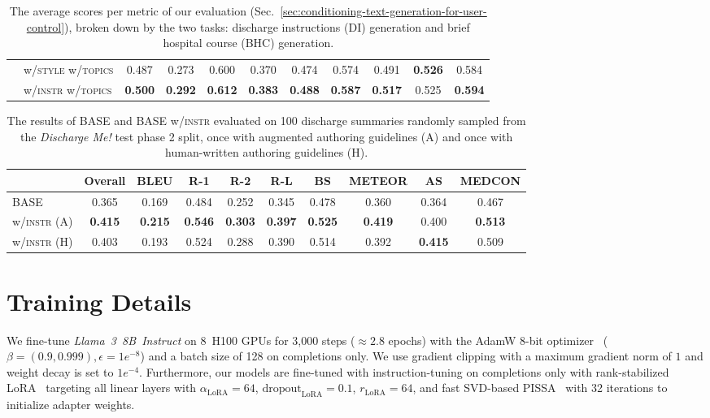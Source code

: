 \begin{table*}[t!]
{\begin{tabular}{llccccccccc}
 & \hspace{3mm} w/\textsc{style} w/\textsc{topics} & 0.487 & 0.273 & 0.600 & 0.370 & 0.474 & 0.574 & 0.491 & \textbf{0.526} & 0.584 \\
 & \hspace{3mm} w/\textsc{instr} w/\textsc{topics} & \textbf{0.500} & \textbf{0.292} & \textbf{0.612} & \textbf{0.383} & \textbf{0.488} & \textbf{0.587} & \textbf{0.517} & 0.525 & \textbf{0.594} \\
\hline
\end{tabular}
}
\caption{The average scores per metric of our evaluation (Sec.~\ref{sec:conditioning-text-generation-for-user-control}), broken down by the two tasks: discharge instructions (DI) generation and brief hospital course (BHC) generation.}
\label{table:task_performance}
\end{table*}

\begin{table*}[t!]
\centering
\begin{tabular}{lccccccccc}
\hline
 & Overall & BLEU & R-1 & R-2 & R-L & BS & METEOR & AS & MEDCON \\
\hline
BASE & 0.365 & 0.169 & 0.484 & 0.252 & 0.345 & 0.478 & 0.360 & 0.364 & 0.467 \\

\hspace{3mm} w/\textsc{instr} (A) & \textbf{0.415} & \textbf{0.215} & \textbf{0.546} & \textbf{0.303} & \textbf{0.397} & \textbf{0.525} & \textbf{0.419} & 0.400 & \textbf{0.513}  \\
\hspace{3mm} w/\textsc{instr} (H) & 0.403 & 0.193 & 0.524 & 0.288 & 0.390 & 0.514 & 0.392 & \textbf{0.415} & 0.509 \\
\hline
\end{tabular}
\caption{The results of BASE and BASE w/\textsc{instr} evaluated on 100 discharge summaries randomly sampled from the \textit{Discharge Me!} test phase 2 split, once with augmented authoring guidelines (A) and once with human-written authoring guidelines (H).}
\label{table:human_evaluation_results}
\end{table*}

\section{Training Details}
\label{subsec:Training-Details}

We fine-tune \textit{Llama~3~8B~Instruct} on 8~H100 GPUs for 3,000 steps ($\approx 2.8$ epochs) with the AdamW 8\nobreakdash-bit optimizer~\citep{dettmers20228bitoptimizersblockwisequantization} ($\beta = (0.9, 0.999), \epsilon=1e^{-8}$) and a batch size of 128 on completions only. We use gradient clipping with a maximum gradient norm of $1$ and weight decay is set to $1e^{-4}$.  Furthermore, our models are fine-tuned with instruction-tuning on completions only with rank-stabilized LoRA~\citep{kalajdzievski2023rankstabilizationscalingfactor} targeting all linear layers with $\alpha_{\text{LoRA}} = 64$, $\text{dropout}_{\text{LoRA}} = 0.1$, $r_{\text{LoRA}} = 64$, and fast SVD-based PISSA~\citep{meng2024pissaprincipalsingularvalues} with 32 iterations to initialize adapter weights. 

